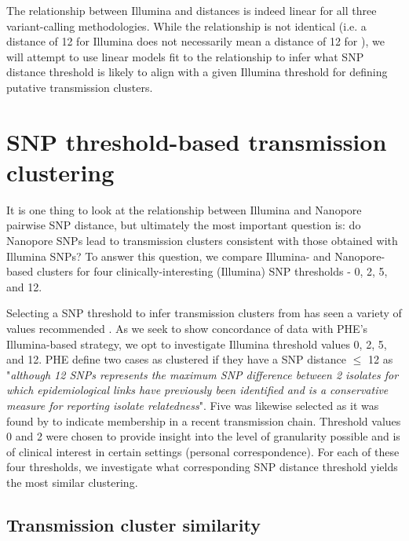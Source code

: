 The relationship between Illumina and \ont{} distances is indeed linear for all three variant-calling methodologies. While the relationship is not identical (i.e. a distance of 12 for Illumina does not necessarily mean a distance of 12 for \ont{}), we will attempt to use linear models fit to the relationship to infer what \ont{} SNP distance threshold is likely to align with a given Illumina threshold for defining putative transmission clusters.


\section{SNP threshold-based \ont{} transmission clustering}
\label{sec:clustering}

It is one thing to look at the relationship between Illumina and
Nanopore pairwise SNP distance, but ultimately the most important
question is: do Nanopore SNPs lead to transmission clusters consistent
with those obtained with Illumina SNPs? To answer this question, we
compare Illumina- and Nanopore-based clusters for{ four
clinically-interesting (Illumina) SNP thresholds -} 0, 2, 5, and 12. 

Selecting a SNP threshold to infer transmission clusters from has seen a
variety of values recommended \cite{stimson2019}. As we seek to show
concordance of \ont{} data with PHE's Illumina-based strategy, we opt
to investigate Illumina threshold values 0, 2, 5, and 12. PHE define two cases as clustered
if they have a SNP distance $\le$ 12 as "\emph{although 12
SNPs represents the maximum SNP difference between 2 isolates for which
epidemiological links have previously been identified
\cite{walker2013} and is a conservative measure for reporting
isolate relatedness}"\cite{phe-tb-england}. Five was likewise selected as
it was found by \cite{walker2013} to indicate membership in a recent
transmission chain. Threshold values 0 and 2 were chosen to provide
insight into the level of granularity possible and is of clinical
interest in certain settings (personal correspondence). For each of these four thresholds, we investigate what corresponding \ont{} SNP distance threshold yields the most similar clustering.

\subsection{Transmission cluster similarity}
\label{sec:cluster-similarity}


